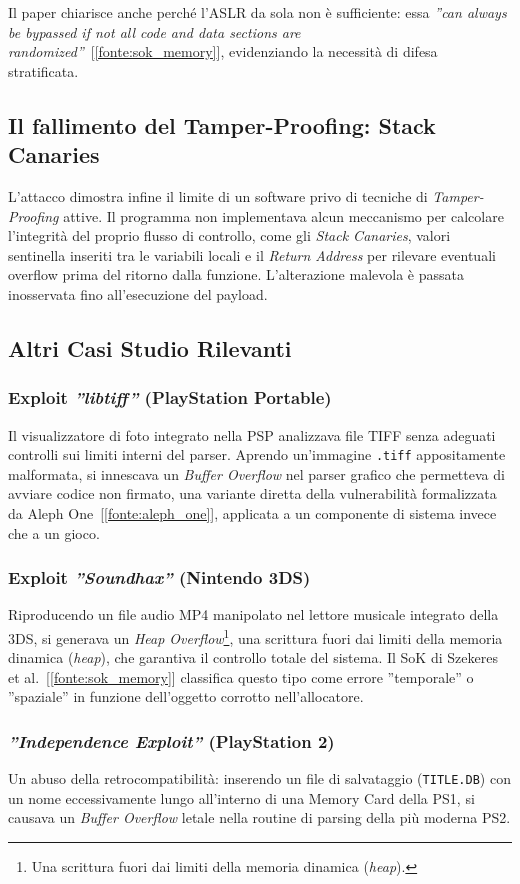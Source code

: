 Il paper chiarisce anche perché l'ASLR da sola non è sufficiente: essa \textit{''can always be bypassed if not all code and data sections are randomized''}~[\ref{fonte:sok_memory}], evidenziando la necessità di difesa stratificata.

\subsection{Il fallimento del Tamper-Proofing: Stack Canaries}

L'attacco dimostra infine il limite di un software privo di tecniche di \textit{Tamper-Proofing} attive. Il programma non implementava alcun meccanismo per calcolare l'integrità del proprio flusso di controllo, come gli \textit{Stack Canaries}, valori sentinella inseriti tra le variabili locali e il \textit{Return Address} per rilevare eventuali overflow prima del ritorno dalla funzione. L'alterazione malevola è passata inosservata fino all'esecuzione del payload.

\subsection{Altri Casi Studio Rilevanti}

\subsubsection*{Exploit \textit{''libtiff''} (PlayStation Portable)}

Il visualizzatore di foto integrato nella PSP analizzava file TIFF senza adeguati controlli sui limiti interni del parser. Aprendo un'immagine \texttt{.tiff} appositamente malformata, si innescava un \textit{Buffer Overflow} nel parser grafico che permetteva di avviare codice non firmato, una variante diretta della vulnerabilità formalizzata da Aleph One~[\ref{fonte:aleph_one}], applicata a un componente di sistema invece che a un gioco.

\subsubsection*{Exploit \textit{''Soundhax''} (Nintendo 3DS)}

Riproducendo un file audio MP4 manipolato nel lettore musicale integrato della 3DS, si generava un \textit{Heap Overflow}\footnote{Una scrittura fuori dai limiti della memoria dinamica (\textit{heap}).}, una scrittura fuori dai limiti della memoria dinamica (\textit{heap}), che garantiva il controllo totale del sistema. Il SoK di Szekeres et al.~[\ref{fonte:sok_memory}] classifica questo tipo come errore ''temporale'' o ''spaziale'' in funzione dell'oggetto corrotto nell'allocatore.

\subsubsection*{\textit{''Independence Exploit''} (PlayStation 2)}

Un abuso della retrocompatibilità: inserendo un file di salvataggio (\texttt{TITLE.DB}) con un nome eccessivamente lungo all'interno di una Memory Card della PS1, si causava un \textit{Buffer Overflow} letale nella routine di parsing della più moderna PS2.